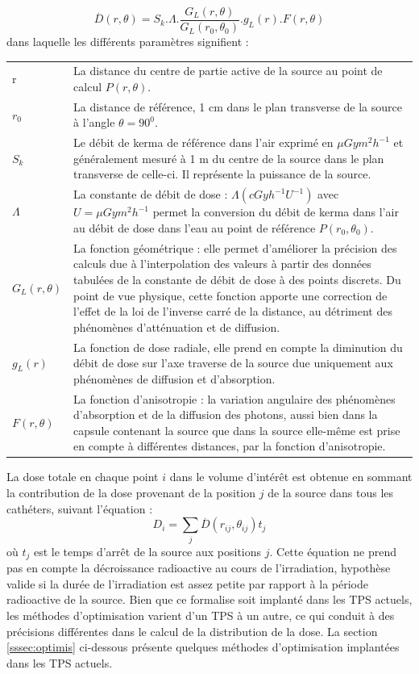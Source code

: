 %
\begin{equation}\label{eqn:DoseRef}
	\stackrel{.}{D}\left(r,\theta\right)=S_{k}.\Lambda . \frac{G_{L}\left(r,\theta\right)}{G_{L}\left(r_{0},\theta_{0}\right)}.g_{L}\left(r\right).F\left(r,\theta\right)
\end{equation}
%
dans laquelle les différents paramètres signifient :
%
\renewcommand{\arraystretch}{1.5}
\begin{longtable}{p{1.5cm} p{13.4cm}}
r & La distance du centre de partie active de la source au point de calcul $P(r, \theta)$. \\
%
$r_{0}$ & La distance de référence, 1 cm dans le plan transverse de la source à l’angle $\theta = 90^{0}$.\\
%
$S_{k}$ & Le débit de kerma de référence dans l’air exprimé en $\mu Gym^{2} h^{-1}$ et généralement mesuré à 1 m du centre de la source dans le plan transverse de celle-ci. Il représente la puissance de la source. \\
%
$\Lambda$ & La constante de débit de dose : $\Lambda (cGy h^{-1} U^{-1})$ avec $U=\mu Gym^{2} h^{-1}$   permet la conversion du débit de kerma dans l'air au débit de dose dans l'eau au point de référence $P(r_{0}, \theta_{0})$.\\
%
$G_{L}(r, \theta)$ & La fonction géométrique : elle permet d’améliorer la précision des calculs due à l’interpolation des valeurs à partir des données tabulées de la constante de débit de dose à des points discrets. Du point de vue physique, cette fonction apporte une correction de l’effet de la loi de l’inverse carré de la distance, au détriment des phénomènes d’atténuation et de diffusion. \\
%
$g_{L}(r)$ & La fonction de dose radiale, elle prend en compte la diminution du débit de dose sur l’axe traverse de la source due uniquement aux phénomènes de diffusion et d’absorption. \\
%
$F(r, \theta)$ & La fonction d’anisotropie : la variation angulaire des phénomènes d'absorption et de la diffusion des photons, aussi bien dans la capsule contenant la source que dans la source elle-même est prise en compte à différentes distances, par la fonction d'anisotropie. \\
%
\end{longtable}
%
\newpage 
La dose totale en chaque point $i$ dans le volume d’intérêt est obtenue en sommant la contribution de la dose provenant de la position $j$ de la source dans tous les cathéters, suivant l’équation :
%
\begin{equation}\label{eqn:DoseTot}
D_{i}=\sum_{j}\stackrel{.}{D}\left(r_{ij}, \theta_{ij}\right)t_{j}
\end{equation}
%
où $t_{j}$ est le temps d’arrêt de la source aux positions $j$. Cette équation ne prend pas en compte la décroissance radioactive au cours de l’irradiation, hypothèse valide si la durée de l’irradiation est assez petite par rapport à la période radioactive de la source. Bien que ce formalise soit implanté dans les TPS actuels, les méthodes d’optimisation varient d’un TPS à un autre, ce qui conduit à des précisions différentes dans le calcul de la distribution de la dose. La section \ref{sssec:optimis} ci-dessous présente quelques méthodes d’optimisation implantées dans les TPS actuels.
%
